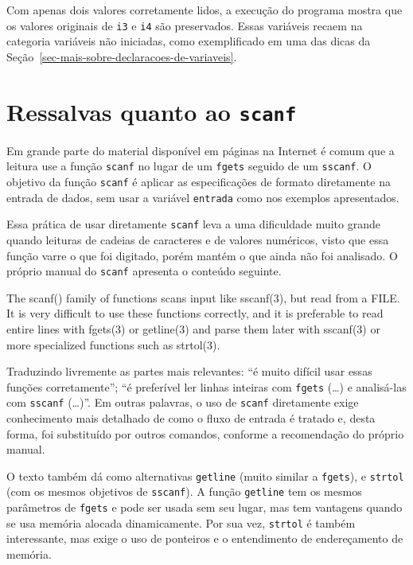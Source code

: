\documentclass[
  11pt,
  a4paper,
]{scrbook}
\newenvironment{Shaded}{\begin{snugshade}}{\end{snugshade}}
\newcommand{\NormalTok}[1]{#1}
\begin{document}
Com apenas dois valores corretamente lidos, a execução do programa
mostra que os valores originais de \texttt{i3} e \texttt{i4} são
preservados. Essas variáveis recaem na categoria variáveis não
iniciadas, como exemplificado em uma das dicas da
Seção~\ref{sec-mais-sobre-declaracoes-de-variaveis}.

\section{\texorpdfstring{Ressalvas quanto ao
\texttt{scanf}}{Ressalvas quanto ao scanf}}\label{ressalvas-quanto-ao-scanf}

Em grande parte do material disponível em páginas na Internet é comum
que a leitura use a função \texttt{scanf} no lugar de um \texttt{fgets}
seguido de um \texttt{sscanf}. O objetivo da função \texttt{scanf} é
aplicar as especificações de formato diretamente na entrada de dados,
sem usar a variável \texttt{entrada} como nos exemplos apresentados.

Essa prática de usar diretamente \texttt{scanf} leva a uma dificuldade
muito grande quando leituras de cadeias de caracteres e de valores
numéricos, visto que essa função varre o que foi digitado, porém mantém
o que ainda não foi analisado. O próprio manual do \texttt{scanf}
apresenta o conteúdo seguinte.

\begin{Shaded}
\begin{Highlighting}[]
\NormalTok{The scanf() family  of functions scans input like sscanf(3), but read}
\NormalTok{from a FILE.  It is very difficult to use  these  functions  correctly,}
\NormalTok{and  it  is preferable to read entire lines with fgets(3) or getline(3)}
\NormalTok{and parse them later with sscanf(3) or more specialized functions  such}
\NormalTok{as strtol(3).}
\end{Highlighting}
\end{Shaded}

Traduzindo livremente as partes mais relevantes: ``é muito difícil usar
essas funções corretamente''; ``é preferível ler linhas inteiras com
\texttt{fgets} (\ldots) e analisá-las com \texttt{sscanf} (\ldots)''. Em
outras palavras, o uso de \texttt{scanf} diretamente exige conhecimento
mais detalhado de como o fluxo de entrada é tratado e, desta forma, foi
substituído por outros comandos, conforme a recomendação do próprio
manual.

  O texto
também dá como alternativas \texttt{getline} (muito similar a
\texttt{fgets}), e \texttt{strtol} (com os mesmos objetivos de
\texttt{sscanf}). A função \texttt{getline} tem os mesmos parâmetros de
\texttt{fgets} e pode ser usada sem seu lugar, mas tem vantagens quando
se usa memória alocada dinamicamente. Por sua vez, \texttt{strtol} é
também interessante, mas exige o uso de ponteiros e o entendimento de
endereçamento de memória.
\end{document}
